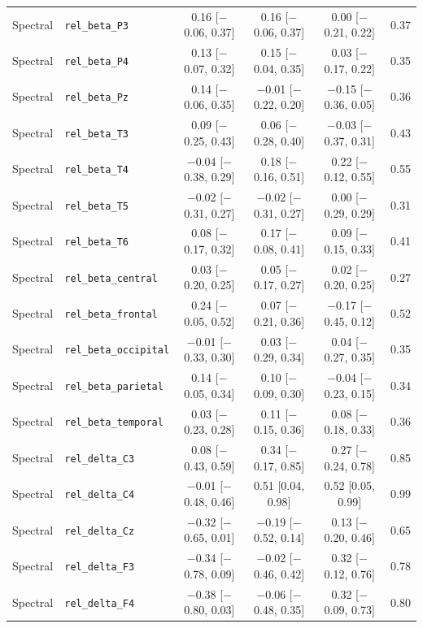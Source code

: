 {\begin{longtable}{llcccc}
Spectral & \texttt{rel\_beta\_P3} & 0.16 [$-$0.06, 0.37] & 0.16 [$-$0.06, 0.37] & 0.00 [$-$0.21, 0.22] & 0.37 \\
Spectral & \texttt{rel\_beta\_P4} & 0.13 [$-$0.07, 0.32] & 0.15 [$-$0.04, 0.35] & 0.03 [$-$0.17, 0.22] & 0.35 \\
Spectral & \texttt{rel\_beta\_Pz} & 0.14 [$-$0.06, 0.35] & $-$0.01 [$-$0.22, 0.20] & $-$0.15 [$-$0.36, 0.05] & 0.36 \\
Spectral & \texttt{rel\_beta\_T3} & 0.09 [$-$0.25, 0.43] & 0.06 [$-$0.28, 0.40] & $-$0.03 [$-$0.37, 0.31] & 0.43 \\
Spectral & \texttt{rel\_beta\_T4} & $-$0.04 [$-$0.38, 0.29] & 0.18 [$-$0.16, 0.51] & 0.22 [$-$0.12, 0.55] & 0.55 \\
Spectral & \texttt{rel\_beta\_T5} & $-$0.02 [$-$0.31, 0.27] & $-$0.02 [$-$0.31, 0.27] & 0.00 [$-$0.29, 0.29] & 0.31 \\
Spectral & \texttt{rel\_beta\_T6} & 0.08 [$-$0.17, 0.32] & 0.17 [$-$0.08, 0.41] & 0.09 [$-$0.15, 0.33] & 0.41 \\
Spectral & \texttt{rel\_beta\_central} & 0.03 [$-$0.20, 0.25] & 0.05 [$-$0.17, 0.27] & 0.02 [$-$0.20, 0.25] & 0.27 \\
Spectral & \texttt{rel\_beta\_frontal} & 0.24 [$-$0.05, 0.52] & 0.07 [$-$0.21, 0.36] & $-$0.17 [$-$0.45, 0.12] & 0.52 \\
Spectral & \texttt{rel\_beta\_occipital} & $-$0.01 [$-$0.33, 0.30] & 0.03 [$-$0.29, 0.34] & 0.04 [$-$0.27, 0.35] & 0.35 \\
Spectral & \texttt{rel\_beta\_parietal} & 0.14 [$-$0.05, 0.34] & 0.10 [$-$0.09, 0.30] & $-$0.04 [$-$0.23, 0.15] & 0.34 \\
Spectral & \texttt{rel\_beta\_temporal} & 0.03 [$-$0.23, 0.28] & 0.11 [$-$0.15, 0.36] & 0.08 [$-$0.18, 0.33] & 0.36 \\
Spectral & \texttt{rel\_delta\_C3} & 0.08 [$-$0.43, 0.59] & 0.34 [$-$0.17, 0.85] & 0.27 [$-$0.24, 0.78] & 0.85 \\
Spectral & \texttt{rel\_delta\_C4} & $-$0.01 [$-$0.48, 0.46] & 0.51 [0.04, 0.98] & 0.52 [0.05, 0.99] & 0.99 \\
Spectral & \texttt{rel\_delta\_Cz} & $-$0.32 [$-$0.65, 0.01] & $-$0.19 [$-$0.52, 0.14] & 0.13 [$-$0.20, 0.46] & 0.65 \\
Spectral & \texttt{rel\_delta\_F3} & $-$0.34 [$-$0.78, 0.09] & $-$0.02 [$-$0.46, 0.42] & 0.32 [$-$0.12, 0.76] & 0.78 \\
Spectral & \texttt{rel\_delta\_F4} & $-$0.38 [$-$0.80, 0.03] & $-$0.06 [$-$0.48, 0.35] & 0.32 [$-$0.09, 0.73] & 0.80 \\

\end{longtable}}

